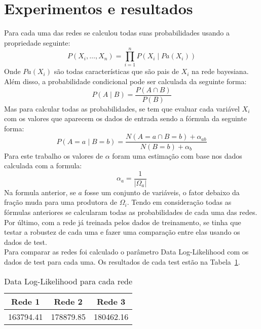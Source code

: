 \section{Experimentos e resultados}

Para cada uma das redes se calculou todas suas probabilidades usando a propriedade seguinte:
	\[ P( X_i , \ldots , X_n ) = \prod_{i=1}^{n} P( X_i \mid {Pa}( X_i ) ) \]
Onde ${Pa}( X_i )$ são todas características que são pais de $X_i$ na rede bayesiana. Além disso, a probabilidade condicional pode ser calculada da seguinte forma:
	\[ P( A \mid B ) = \frac{ P( A \cap B ) }{ P( B ) }\]
Mas para calcular todas as probabilidades, se tem que evaluar cada variável $X_i$ com os valores que aparecem os dados de entrada sendo a fórmula da seguinte forma:
	\[ P( A = a \mid B = b ) = \frac{ N( A = a \cap B = b ) + \alpha_{ab} }{N( B = b ) + \alpha_b } \]
Para este trabalho os valores de $\alpha$ foram uma estimação com base nos dados calculada com a formula:
	\[ \alpha_{a} = \frac{ 1 }{ |\Omega_a|} \]
Na formula anterior, se $a$ fosse um conjunto de variáveis, o fator debaixo da fração muda para uma produtora de $\Omega_i$.
Tendo em consideração todas as fórmulas anteriores se calcularam todas as probabilidades de cada uma das redes.
\\
Por último, com a rede já treinada pelos dados de treinamento, se tinha que testar a robustez de cada uma e fazer uma comparação entre elas usando os dados de test.
\\
Para comparar as redes foi calculado o parâmetro Data Log-Likelihood com os dados de test para cada uma. Os resultados de cada test estão na Tabela~\ref{tab:loglike}.

	\begin{table}[ h ]
		\centering
		\begin{tabular}{ | c | c | c | }
			\hline
			Rede 1 & Rede 2 & Rede 3 \\ \hline
			163794.41 & 178879.85 & 180462.16 \\ \hline
		\end{tabular}
		\caption{Data Log-Likelihood para cada rede}
		\label{tab:loglike}
	\end{table}

\clearpage